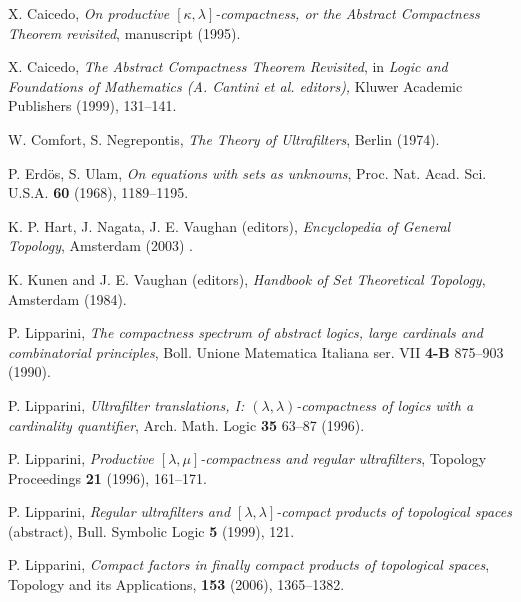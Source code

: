 \documentclass[12pt]{amsart}
\theoremstyle{definition}
\theoremstyle{remark}
\begin{document}
\begin{thebibliography}{} 


 X. Caicedo, {\em On productive 
$[\kappa,\lambda]$-compactness, or  the Abstract Compactness Theorem revisited},  manuscript (1995). 

 X. Caicedo, {\em The Abstract Compactness Theorem Revisited}, in 
{\em Logic and Foundations of Mathematics (A. Cantini et al. editors),} 
Kluwer Academic Publishers  (1999), 131--141. 

  W. Comfort, S. Negrepontis, {\em The Theory of Ultrafilters}, Berlin (1974). 

 P. Erd\"os, S. Ulam, {\em On equations with sets as unknowns}, 
Proc. Nat. Acad. Sci. U.S.A.  \textbf{60} (1968), 1189--1195. 

 K. P. Hart, J. Nagata, J. E. Vaughan (editors), {\em Encyclopedia of General Topology}, Amsterdam (2003) . 

 K. Kunen and J. E. Vaughan (editors), {\em  Handbook of Set Theoretical
Topology}, Amsterdam (1984).

 P. Lipparini, {\em The compactness spectrum of abstract logics, large 
cardinals and combinatorial principles}, Boll. Unione Matematica Italiana ser. 
VII {\bf 4-B} 875--903 (1990).

 P. Lipparini,  
{\em Ultrafilter translations, I: $(\lambda,\lambda )$-compactness 
of logics with a cardinality quantifier}, Arch. Math. Logic {\bf 35} 
63--87 (1996).

 P. Lipparini,  {\em Productive $[\lambda,\mu ]$-compactness and regular
ultrafilters}, Topology Proceedings \textbf{21} (1996), 161--171.
 
 P. Lipparini,  {\em Regular
ultrafilters and $[ \lambda , \lambda ]$-compact products of topological spaces}
 (abstract), Bull. Symbolic Logic \textbf{5} (1999), 121.

 P. Lipparini,  {\em Compact factors in finally compact products of topological spaces}, 
Topology and its Applications, \textbf{153} (2006), 1365--1382.






\end{thebibliography} 
\end{document}
